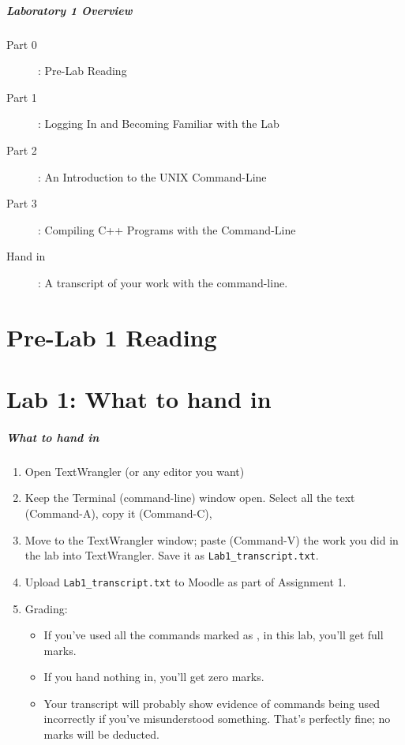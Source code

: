 \documentclass{beamer}
\subtitle[Intro to the Command-Line, and Compilation] {Lab1: Intro to the Command-Line, and Compilation}
\institute[University of Saskatchewan] {
  Department of Computer Science\\ University of Saskatchewan
}
\date[Lab1] {January 11 -- 15, 2016}
\begin{document}
\maketitle

\begin{frame}[fragile]
\frametitle{Laboratory 1 Overview}
\begin{description}
\item [Part 0]: Pre-Lab Reading
\item [Part 1]: Logging In and Becoming Familiar with the Lab
\item [Part 2]: An Introduction to the UNIX Command-Line
\item [Part 3]: Compiling C++ Programs with the Command-Line
\item [Hand in]: A transcript of your work with the command-line.
\end{description} 
\end{frame}

\part{Pre-Lab 1 Reading}
\frame{\partpage}









\part{Lab 1: What to hand in}
\frame{\partpage}

\begin{frame}[fragile]
\frametitle{What to hand in}

\begin{enumerate}
\item Open TextWrangler (or any editor you want)
\item Keep the Terminal (command-line) window open.  Select all the text (Command-A), copy it (Command-C),
\item Move to the TextWrangler window; paste (Command-V) the work you did in the lab into TextWrangler.  Save it as \verb|Lab1_transcript.txt|.
\item Upload \verb|Lab1_transcript.txt| to Moodle as part of Assignment 1.
\item Grading: 
\begin{itemize}
\item If you've used all the commands marked as \activity, in this lab, you'll get full marks.  
\item If you hand nothing in, you'll get zero marks.   
\item Your transcript will probably show evidence of commands being used incorrectly if you've misunderstood something.  That's perfectly fine; no marks will be deducted.
\end{itemize}
\end{enumerate}

\end{frame}
\end{document}
